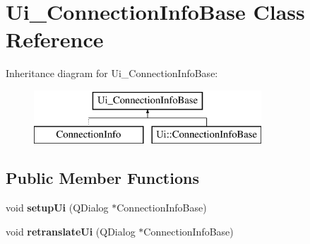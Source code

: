 \hypertarget{classUi__ConnectionInfoBase}{
\section{Ui\_\-ConnectionInfoBase Class Reference}
\label{classUi__ConnectionInfoBase}
}
Inheritance diagram for Ui\_\-ConnectionInfoBase:\begin{figure}[H]
\begin{center}
\leavevmode
\includegraphics[height=2.000000cm]{classUi__ConnectionInfoBase}
\end{center}
\end{figure}
\subsection*{Public Member Functions}
\begin{DoxyCompactItemize}
\item 
\hypertarget{classUi__ConnectionInfoBase_ab01b4889ef75c1231186e5f5398578f1}{
void {\bfseries setupUi} (QDialog $\ast$ConnectionInfoBase)}
\label{classUi__ConnectionInfoBase_ab01b4889ef75c1231186e5f5398578f1}

\item 
\hypertarget{classUi__ConnectionInfoBase_afe16d38921bcd69e3d06530c37f4b7f7}{
void {\bfseries retranslateUi} (QDialog $\ast$ConnectionInfoBase)}
\label{classUi__ConnectionInfoBase_afe16d38921bcd69e3d06530c37f4b7f7}

\end{DoxyCompactItemize}
